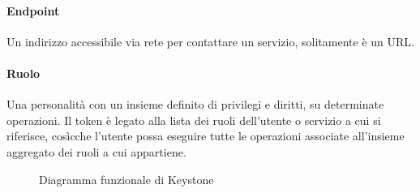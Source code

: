 \paragraph{Endpoint}
Un indirizzo accessibile via rete per contattare un servizio, solitamente è un URL.
\paragraph{Ruolo}
Una personalità con un insieme definito di privilegi e diritti, su determinate operazioni.
Il token è legato alla lista dei ruoli dell'utente o servizio a cui si riferisce, cosìcche l'utente possa eseguire tutte le operazioni associate all'insieme aggregato dei ruoli a cui appartiene.

\begin{figure}[H]
\centering
{}
\caption{Diagramma funzionale di Keystone\cite{openstackkeystone}}\label{openstackkeystone}
\end{figure}

